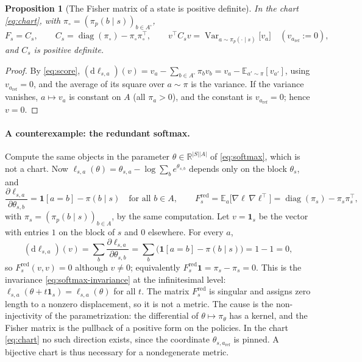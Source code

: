 \documentclass[11pt,a4paper]{article}
\numberwithin{equation}{section}
\theoremstyle{plain}
\newtheorem{proposition}[theorem]{Proposition}
\theoremstyle{definition}
\theoremstyle{remark}
\newcommand{\R}{\mathbb{R}}
\newcommand{\E}{\mathbb{E}}
\newcommand{\T}{^{\top}}
\newcommand{\dd}{\mathrm{d}}
\DeclareMathOperator{\Var}{Var}
\DeclareMathOperator{\diag}{diag}
\newcommand{\aref}{a_{\mathrm{ref}}}
\newcommand{\Ao}{A^{\circ}}
\newcommand{\pio}{\pi_{\circ}}
\newcommand{\Ind}{\mathbf{1}}
\begin{document}
\begin{proposition}[The Fisher matrix of a state is positive definite]\label{prop:fisher-pd}
In the chart \eqref{eq:chart}, with $\pio=(\pi_p(b\mid s))_{b\in\Ao}$,
\begin{equation}\label{eq:Cs}
  F_s=C_s,\qquad C_s=\diag(\pio)-\pio\pio\T,\qquad
  v\T C_sv=\Var_{a\sim\pi_p(\cdot\mid s)}\bigl[v_a\bigr]\quad(v_{\aref}:=0),
\end{equation}
and $C_s$ is positive definite.
\end{proposition}

\begin{proof}
By \eqref{eq:score}, $(\dd\ell_{s,a})(v)=v_a-\sum_{b\in\Ao}\pi_bv_b=v_a-\E_{a'\sim\pi}[v_{a'}]$, using $v_{\aref}=0$, and the average of its square over $a\sim\pi$
is the variance. If the variance vanishes, $a\mapsto v_a$ is constant on $A$ (all $\pi_a>0$), and the constant is $v_{\aref}=0$; hence $v=0$.
\end{proof}

\paragraph{A counterexample: the redundant softmax.}
Compute the same objects in the parameter $\theta\in\R^{|S||A|}$ of \eqref{eq:softmax}, which is not a chart. Now
$\ell_{s,a}(\theta)=\theta_{s,a}-\log\sum_be^{\theta_{s,b}}$ depends only on the block $\theta_s$, and
\[
  \frac{\partial\ell_{s,a}}{\partial\theta_{s,b}}=\Ind[a=b]-\pi(b\mid s)\quad\text{for all }b\in A,
  \qquad
  F_s^{\mathrm{red}}=\E_a\bigl[\nabla\ell\,\nabla\ell\T\bigr]=\diag(\pi_s)-\pi_s\pi_s\T,
\]
with $\pi_s=(\pi_p(b\mid s))_{b\in A}$, by the same computation. Let $v=\mathbf 1_s$ be the vector with entries $1$ on the block of $s$ and $0$ elsewhere. For every $a$,
\[
  (\dd\ell_{s,a})(v)=\sum_b\frac{\partial\ell_{s,a}}{\partial\theta_{s,b}}=\sum_b\bigl(\Ind[a=b]-\pi(b\mid s)\bigr)=1-1=0,
\]
so $F^{\mathrm{red}}_s(v,v)=0$ although $v\ne0$; equivalently $F^{\mathrm{red}}_s\mathbf 1=\pi_s-\pi_s=0$. This is the invariance \eqref{eq:softmax-invariance}
at the infinitesimal level: $\ell_{s,a}(\theta+t\mathbf 1_s)=\ell_{s,a}(\theta)$ for all $t$. The matrix $F^{\mathrm{red}}_s$ is singular and assigns zero
length to a nonzero displacement, so it is not a metric. The cause is the non-injectivity of the parametrization: the differential of $\theta\mapsto\pi_\theta$ has a kernel, and
the Fisher matrix is the pullback of a positive form on the policies. In the chart \eqref{eq:chart} no such direction exists, since the coordinate $\theta_{s,\aref}$ is pinned. A bijective
chart is thus necessary for a nondegenerate metric.
\end{document}
